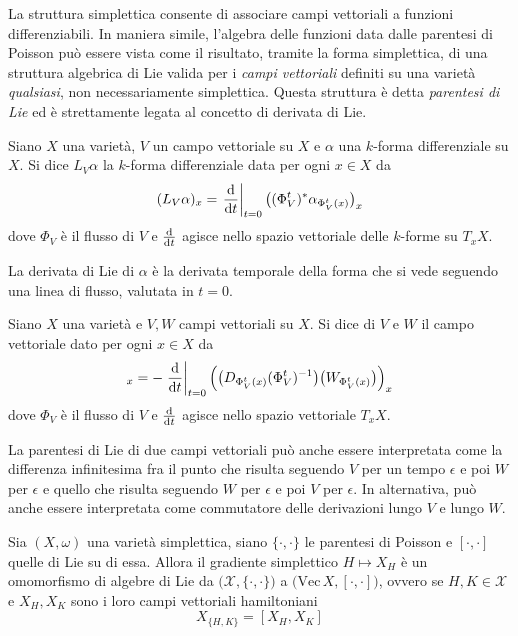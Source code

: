 La struttura simplettica consente di associare campi vettoriali a funzioni differenziabili. In maniera simile, l'algebra delle funzioni data dalle parentesi di Poisson può essere vista come il risultato, tramite la forma simplettica, di una struttura algebrica di Lie valida per i \emph{campi vettoriali} definiti su una varietà \emph{qualsiasi}, non necessariamente simplettica. Questa struttura è detta \emph{parentesi di Lie} ed è strettamente legata al concetto di derivata di Lie.
\begin{definition}
  Siano $X$ una varietà, $V$ un campo vettoriale su $X$ e $\alpha$ una $k$-forma differenziale su $X$. Si dice  $L_V\alpha$ la $k$-forma differenziale data per ogni $x \in X$ da \begin{equation*}
  (L_V \alpha)_x = \eval{\dv{t}}_{t=0} \big( (\Phi_V^t)^* \alpha_{\Phi_V^t(x)}\big)_x
  \end{equation*} 
  dove $\Phi_V$ è il flusso di $V$ e $\dv{t}$ agisce nello spazio vettoriale delle $k$-forme su $T_x X$.
\end{definition}
\begin{remark}
  La derivata di Lie di $\alpha$ è la derivata temporale della forma che si vede seguendo una linea di flusso, valutata in $t=0$.
\end{remark}
\begin{definition}
  Siano $X$ una varietà e $V,W$ campi vettoriali su $X$. Si dice  di $V$ e $W$ il campo vettoriale dato per ogni $x \in X$ da \begin{equation*}
  [V,W]_x = - \eval{\dv{t}}_{t=0} \Big(\big(D_{\Phi_V^t(x)} (\Phi_V^t)^{-1}\big)\big(W_{\Phi_V^t(x)}\big) \Big)_x
  \end{equation*}
  dove $\Phi_V$ è il flusso di $V$ e $\dv{t}$ agisce nello spazio vettoriale $T_x X$.
\end{definition}
\begin{remark}
  La parentesi di Lie di due campi vettoriali può anche essere interpretata come la differenza infinitesima fra il punto che risulta seguendo $V$ per un tempo $\epsilon$ e poi $W$ per $\epsilon$ e quello che risulta seguendo $W$ per $\epsilon$ e poi $V$ per $\epsilon$. In alternativa, può anche essere interpretata come commutatore delle derivazioni lungo $V$ e lungo $W$.
\end{remark}
\begin{theorem}
  Sia $(X, \omega)$ una varietà simplettica, siano $\{\cdot , \cdot \}$ le parentesi di Poisson e $[\cdot , \cdot ]$ quelle di Lie su di essa. Allora il gradiente simplettico $H \mapsto X_H$ è un omomorfismo di algebre di Lie da $\big(\mathcal{X}, \{\cdot , \cdot \} \big)$ a $\big(\mathrm{Vec}\, X, [\cdot , \cdot]\big)$, ovvero se $H,K \in \mathcal{X}$ e $X_H, X_K$ sono i loro campi vettoriali hamiltoniani \begin{equation*}
  X_{\{H,K\}} = [X_H, X_K]
  \end{equation*} 
\end{theorem}

